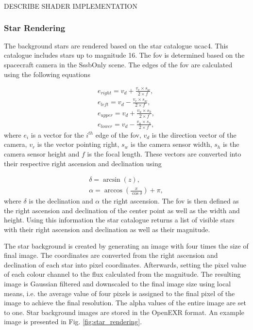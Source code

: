 DESCRIBE SHADER IMPLEMENTATION

\subsubsection{Star Rendering} \label{sec:stars}
The background stars are rendered based on the star catalogue \gls{ucac4}. This catalogue includes stars up to magnitude 16. The \gls{fov} is determined based on the spacecraft camera in the SssbOnly scene. The edges of the \gls{fov} are calculated using the following equations

\begin{align}
    e_{right} = v_d + \frac{v_r \times s_w}{2 \times f}, \label{eq:edge_right} \\
    e_{left} = v_d - \frac{v_r \times s_w}{2 \times f}, \label{eq:edge_left} \\
    e_{upper} = v_d + \frac{v_u \times s_h}{2 \times f}, \label{eq:edge_upper} \\
    e_{lower} = v_d - \frac{v_u \times s_h}{2 \times f}, \label{eq:edge_lower}
\end{align}
where $e_{i}$ is a vector for the $i^{th}$ edge of the \gls{fov}, $v_d$ is the direction vector of the camera, $v_r$ is the vector pointing right, $s_w$ is the camera sensor width, $s_h$ is the camera sensor height and $f$ is the focal length. These vectors are converted into their respective right ascension and declination using

\begin{align}
    \delta = \arcsin{(z)}, \label{eq:declination} \\
    \alpha = \arccos{\left(\frac{x}{\cos{\delta}}\right)} + \pi, \label{eq:right_ascension}
\end{align}
where $\delta$ is the declination and $\alpha$ the right ascension. The \gls{fov} is then defined as the right ascension and declination of the center point as well as the width and height. Using this information the star catalogue returns a list of visible stars with their right ascension and declination as well as their magnitude.

The star background is created by generating an image with four times the size of final image. The coordinates are converted from the right ascension and declination of each star into pixel coordinates. Afterwards, setting the pixel value of each colour channel to the flux calculated from the magnitude. The resulting image is Gaussian filtered and downscaled to the final image size using local means, i.e. the average value of four pixels is assigned to the final pixel of the image to achieve the final resolution. The alpha values of the entire image are set to one. Star background images are stored in the OpenEXR format. An example image is presented in Fig. \ref{fig:star_rendering}.

